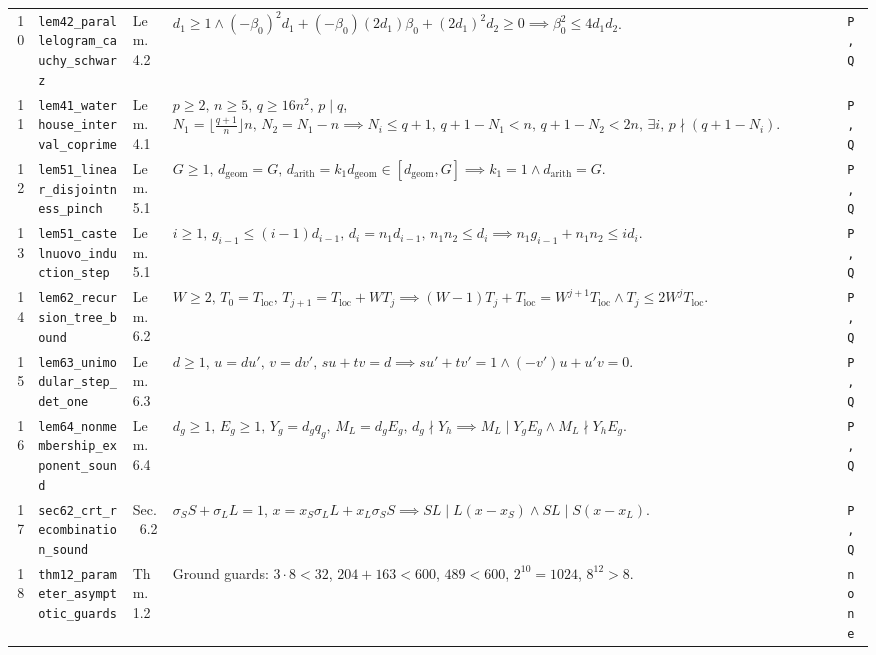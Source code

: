 \documentclass[10pt,twocolumn]{article}
\begin{document}
\begin{table}[t]
\begin{tabular}{@{}r l l p{9.7cm} l@{}}
10 & \texttt{lem42\_parallelogram\_cauchy\_schwarz} & Lem.~4.2 & $d_1\ge 1 \wedge (-\beta_0)^2 d_1 + (-\beta_0)(2d_1)\beta_0 + (2d_1)^2 d_2\ge 0 \implies \beta_0^2 \le 4 d_1 d_2$. & \texttt{P,Q} \\
11 & \texttt{lem41\_waterhouse\_interval\_coprime} & Lem.~4.1 & $p\ge 2,\,n\ge 5,\,q\ge 16n^2,\,p\mid q$, $N_1{=}\lfloor\frac{q+1}{n}\rfloor n,\,N_2{=}N_1{-}n \implies N_i{\le}q{+}1,\,q{+}1{-}N_1{<}n,\,q{+}1{-}N_2{<}2n,\,\exists i,\,p\nmid(q{+}1{-}N_i)$. & \texttt{P,Q} \\
12 & \texttt{lem51\_linear\_disjointness\_pinch} & Lem.~5.1 & $G\ge 1,\,d_{\mathrm{geom}}{=}G,\,d_{\mathrm{arith}}{=}k_1 d_{\mathrm{geom}}\in[d_{\mathrm{geom}},G] \implies k_1=1 \wedge d_{\mathrm{arith}}=G$. & \texttt{P,Q} \\
13 & \texttt{lem51\_castelnuovo\_induction\_step} & Lem.~5.1 & $i\ge 1,\,g_{i-1}\le (i{-}1)d_{i-1},\,d_i{=}n_1 d_{i-1},\,n_1 n_2\le d_i \implies n_1 g_{i-1}+n_1 n_2\le i d_i$. & \texttt{P,Q} \\
14 & \texttt{lem62\_recursion\_tree\_bound} & Lem.~6.2 & $W\ge 2,\,T_0{=}T_{\mathrm{loc}},\,T_{j+1}{=}T_{\mathrm{loc}}{+}W T_j \implies (W{-}1)T_j{+}T_{\mathrm{loc}}{=}W^{j+1}T_{\mathrm{loc}} \wedge T_j{\le}2W^j T_{\mathrm{loc}}$. & \texttt{P,Q} \\
15 & \texttt{lem63\_unimodular\_step\_det\_one} & Lem.~6.3 & $d\ge 1,\,u{=}d u',\,v{=}d v',\,s u{+}t v{=}d \implies s u'{+}t v'{=}1 \wedge (-v')u{+}u'v{=}0$. & \texttt{P,Q} \\
16 & \texttt{lem64\_nonmembership\_exponent\_sound} & Lem.~6.4 & $d_g{\ge}1,\,E_g{\ge}1,\,Y_g{=}d_g q_g,\,M_L{=}d_g E_g,\,d_g\nmid Y_h \implies M_L\mid Y_g E_g \wedge M_L\nmid Y_h E_g$. & \texttt{P,Q} \\
17 & \texttt{sec62\_crt\_recombination\_sound} & Sec.~6.2 & $\sigma_S S{+}\sigma_L L{=}1,\,x{=}x_S\sigma_L L{+}x_L\sigma_S S \implies SL\mid L(x{-}x_S) \wedge SL\mid S(x{-}x_L)$. & \texttt{P,Q} \\
18 & \texttt{thm12\_parameter\_asymptotic\_guards} & Thm.~1.2 & Ground guards: $3\cdot 8 < 32$, $204+163<600$, $489<600$, $2^{10}=1024$, $8^{12}>8$. & \texttt{none} \\
\bottomrule
\end{tabular}
\end{table}
\end{document}
